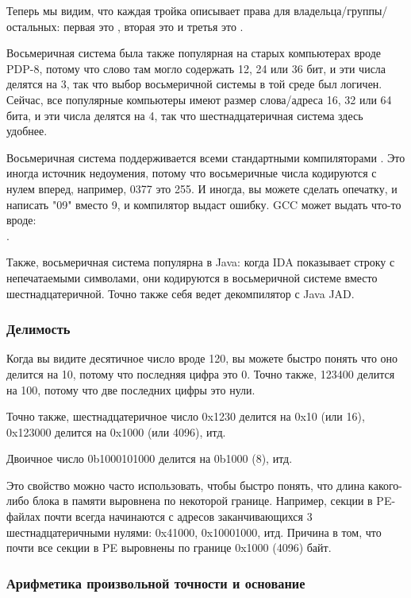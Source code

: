Теперь мы видим, что каждая тройка описывает права для владельца/группы/остальных:
первая это , вторая это  и третья это .

Восьмеричная система была также популярная на старых компьютерах вроде PDP-8, потому что слово там могло содержать 12, 24 или
36 бит, и эти числа делятся на 3, так что выбор восьмеричной системы в той среде был логичен.
Сейчас, все популярные компьютеры имеют размер слова/адреса 16, 32 или 64 бита, и эти числа делятся на 4,
так что шестнадцатеричная система здесь удобнее.

Восьмеричная система поддерживается всеми стандартными компиляторами \CCpp{}.
Это иногда источник недоумения, потому что восьмеричные числа кодируются с нулем вперед, например, 0377 это 255.
И иногда, вы можете сделать опечатку, и написать "09" вместо 9, и компилятор выдаст ошибку.
GCC может выдать что-то вроде:\\
.

Также, восьмеричная система популярна в Java: когда IDA показывает строку с непечатаемыми символами,
они кодируются в восьмеричной системе вместо шестнадцатеричной.
Точно также себя ведет декомпилятор с Java JAD.

\subsubsection{Делимость}

Когда вы видите десятичное число вроде 120, вы можете быстро понять что оно делится на 10, потому что последняя цифра это 0.
Точно также, 123400 делится на 100, потому что две последних цифры это нули.

Точно также, шестнадцатеричное число 0x1230 делится на 0x10 (или 16), 0x123000 делится на 0x1000 (или 4096), итд.

Двоичное число 0b1000101000 делится на 0b1000 (8), итд.

Это свойство можно часто использовать, чтобы быстро понять,
что длина какого-либо блока в памяти выровнена по некоторой границе.
Например, секции в \ac{PE}-файлах почти всегда начинаются с адресов заканчивающихся 3 шестнадцатеричными нулями:
0x41000, 0x10001000, итд.
Причина в том, что почти все секции в \ac{PE} выровнены по границе 0x1000 (4096) байт.

\subsubsection{Арифметика произвольной точности и основание}

